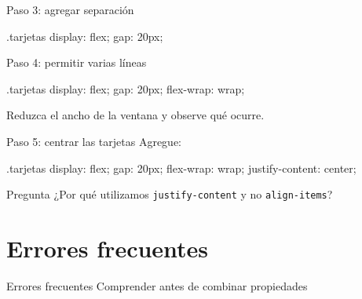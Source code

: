 \documentclass[aspectratio=169,11.5pt]{beamer}
\begin{document}
    \begin{frame}[fragile]{Paso 3: agregar separación}
        \begin{csscodedark}
            .tarjetas {
                display: flex;
                gap: 20px;
            }
        \end{csscodedark}
    \end{frame}

    \begin{frame}[fragile]{Paso 4: permitir varias líneas}
        \begin{csscodedark}
            .tarjetas {
                display: flex;
                gap: 20px;
                flex-wrap: wrap;
            }
        \end{csscodedark}

        Reduzca el ancho de la ventana
        y observe qué ocurre.
    \end{frame}

    \begin{frame}[fragile]{Paso 5: centrar las tarjetas}
        Agregue:

        \begin{csscodedark}
            .tarjetas {
                display: flex;
                gap: 20px;
                flex-wrap: wrap;
                justify-content: center;
            }
        \end{csscodedark}

        \begin{block}{Pregunta}
            ¿Por qué utilizamos
            \texttt{justify-content}
            y no \texttt{align-items}?
        \end{block}
    \end{frame}



    \section{Errores frecuentes}

    \SectionSlide
    {Errores frecuentes}
    {Comprender antes de combinar propiedades}
\end{document}
